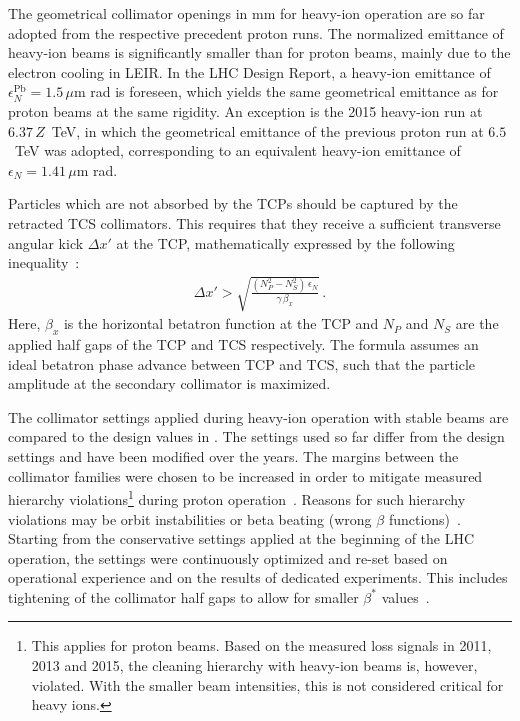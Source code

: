 %
The geometrical collimator openings in mm for heavy-ion operation are so far adopted from the respective precedent proton runs. The normalized emittance of heavy-ion beams is significantly smaller than for proton beams, mainly due to the electron cooling in LEIR. In the LHC Design Report, a heavy-ion emittance of $\epsilon_N^{\text{Pb}} = 1.5\,\mu$m rad is foreseen, which yields the same geometrical emittance as for proton beams at the same rigidity. An exception is the 2015 heavy-ion run at $6.37\,Z$~TeV, in which the geometrical emittance of the previous proton run at $6.5$~TeV was adopted, corresponding to an equivalent heavy-ion emittance of $\epsilon_N = 1.41\,\mu$m rad. 
%
% 
% 


Particles which are not absorbed by the TCPs should be captured by the retracted TCS collimators. This requires that they receive a sufficient transverse angular kick $\Delta x'$ at the TCP, mathematically expressed by the following inequality~\cite{ICOSIMref02}:
%
\begin{align}
  \Delta x' > \sqrt{\frac{(N_P^2 - N_S^2) \, \epsilon_N }{ \gamma \, \beta_x } } \,. \label{dx:secon}
\end{align}
%
Here, $\beta_x$ is the horizontal betatron function at the TCP and $N_P$ and $N_S$ are the applied half gaps of the TCP and TCS respectively. The formula assumes an ideal betatron phase advance between TCP and TCS, such that the particle amplitude at the secondary collimator is maximized.
%

The collimator settings applied during heavy-ion operation with stable beams are compared to the design values in . The settings used so far differ from the design settings and have been modified over the years. The margins between the collimator families were chosen to be increased in order to mitigate measured hierarchy violations\footnote{This applies for proton beams. Based on the measured loss signals in 2011, 2013 and 2015, the cleaning hierarchy with heavy-ion beams is, however, violated. With the smaller beam intensities, this is not considered critical for heavy ions.} during proton operation~\cite{Bruce2014a}. Reasons for such hierarchy violations may be orbit instabilities or beta beating (wrong $\beta$ functions)~\cite{CERN-ATS-NOTE-2011-036MD}. Starting from the conservative settings applied at the beginning of the LHC operation, the settings were continuously optimized and re-set based on operational experience and on the results of dedicated experiments. This includes tightening of the collimator half gaps to allow for smaller $\beta^*$ values~\cite{CERN-ATS-2013-045}.


